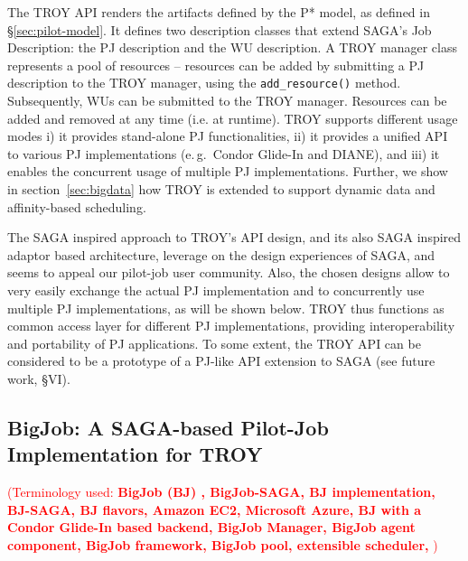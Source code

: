 \documentclass[conference,final]{IEEEtran}
\newcommand{\terminology}[1]{ {\textcolor{red} {(Terminology used: \textbf{#1}) }}}
\newcommand{\jhanote}[1]{ {\textcolor{red} { ***shantenu: #1 }}}
\newcommand{\terminology}[1]{}
\newcommand{\jhanote}[1]{}
\newcommand{\upp}{\vspace*{-0.5em}}
\begin{document}
The TROY API renders the artifacts defined by the P* model, as defined
in \S\ref{sec:pilot-model}. It defines two description classes that
extend SAGA's Job Description: the PJ description and the WU
description. A TROY manager class represents a pool of resources --
resources can be added by submitting a PJ description to the TROY
manager, using the \texttt{add\_resource()} method. Subsequently, WUs
can be submitted to the TROY manager.  Resources can be added and
removed at any time (i.e. at runtime).  TROY supports different usage
modes i) it provides stand-alone PJ functionalities, ii) it provides a
unified API to various PJ implementations (e.\,g.\ Condor Glide-In and
DIANE), and iii) it enables the concurrent usage of multiple PJ
implementations. Further, we show in section~\ref{sec:bigdata} how
TROY is extended to support dynamic data and affinity-based
scheduling.




The SAGA inspired approach to TROY's API design, and its also SAGA
inspired adaptor based architecture, leverage on the design
experiences of SAGA, and seems to appeal our pilot-job user community.
Also, the chosen designs allow to very easily exchange the actual PJ
implementation and to concurrently use multiple PJ implementations, as
will be shown below.  TROY thus functions as common access layer for
different PJ implementations, providing interoperability and
portability of PJ applications.  To some extent, the TROY API can be
considered to be a prototype of a PJ-like API extension to SAGA (see
future work, \S{VI}).


\subsection{BigJob: A SAGA-based Pilot-Job Implementation for TROY\upp\upp}
\terminology{BigJob (BJ) , BigJob-SAGA, BJ implementation,  BJ-SAGA, BJ flavors, Amazon EC2, Microsoft Azure,
 BJ with a Condor Glide-In based backend,  BigJob Manager, BigJob agent component, BigJob framework,
 BigJob pool, extensible scheduler, } 



\end{document}
